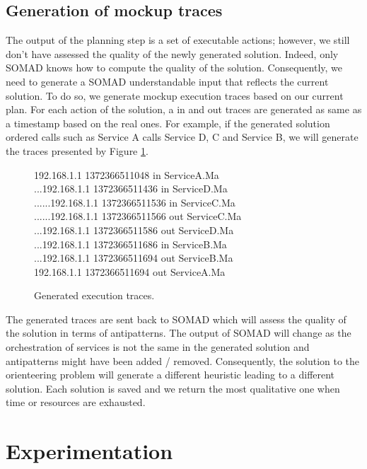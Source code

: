 \documentclass[lnbip]{svmultln}
\begin{document}
\subsection{Generation of mockup traces}

The output of the planning step is a set of executable actions; however, we still don't have assessed the quality of the newly generated solution. Indeed, only SOMAD knows how to compute the quality of the solution. Consequently, we need to generate a SOMAD understandable input that reflects the current solution. To do so, we generate mockup execution traces based on our current plan. For each action of the solution, a in and out traces are generated as same as a timestamp based on the real ones. For example, if the generated solution ordered calls such as Service A calls Service D, C and Service B, we will generate the traces presented by Figure \ref{fig:generated_traces}.

\begin{figure}
\scriptsize{192.168.1.1 1372366511048 in ServiceA.Ma        \\          
...192.168.1.1 1372366511436 in ServiceD.Ma \\
......192.168.1.1 1372366511536 in ServiceC.Ma\\
......192.168.1.1 1372366511566 out ServiceC.Ma\\
...192.168.1.1 1372366511586 out ServiceD.Ma\\
...192.168.1.1 1372366511686 in ServiceB.Ma\\
...192.168.1.1 1372366511694 out ServiceB.Ma\\
192.168.1.1 1372366511694 out ServiceA.Ma}\\
 	\caption{Generated execution traces.}
    \label{fig:generated_traces}
\end{figure}


The generated traces are sent back to SOMAD which will assess the quality of the solution in terms of antipatterns. The output of SOMAD will change as the orchestration of services is not the same in the generated solution and antipatterns might have been added / removed. Consequently, the solution to the orienteering problem will generate a different heuristic leading to a different solution. Each solution is saved and we return the most qualitative one when time or resources are exhausted. 

\section{Experimentation}
\end{document}
